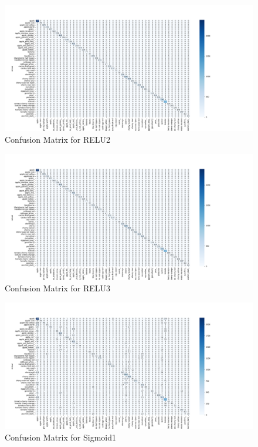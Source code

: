 \documentclass[conference]{IEEEtran}
\begin{document}
\begin{figure}[h!]
    \centering
    \includegraphics[width=\linewidth]{relu2}
    \caption{Confusion Matrix for RELU2}
\end{figure}

\begin{figure}[h!]
    \centering
    \includegraphics[width=\linewidth]{relu3}
    \caption{Confusion Matrix for RELU3}
\end{figure}

\begin{figure}[h!]
    \centering
    \includegraphics[width=\linewidth]{sigmoid1}
    \caption{Confusion Matrix for Sigmoid1}
\end{figure}
\end{document}
